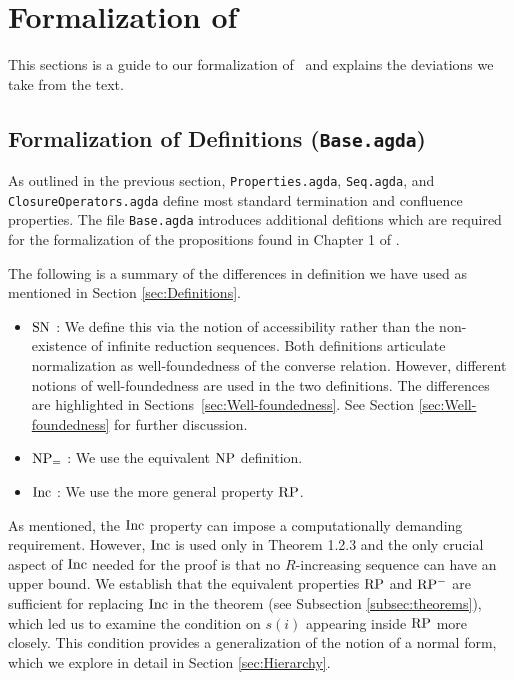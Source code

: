 \section{Formalization of \terese}
\label{sec:Formalization}
This sections is a guide to our formalization of \terese $\,$ and explains the deviations we take from the text. 

\subsection{Formalization of Definitions (\texttt{Base.agda})}\label{subsec:def}

As outlined in the previous section, \texttt{Properties.agda}, \texttt{Seq.agda}, and \texttt{ClosureOperators.agda} define most standard termination and confluence properties. The file \texttt{Base.agda} introduces additional defitions which are required for the formalization of the propositions found in Chapter 1 of \terese.




The following is a summary of the differences in definition we have used as mentioned in Section \ref{sec:Definitions}.
\begin{itemize}
    \item $\mathrm{SN}$ : We define this via the notion of accessibility rather than the non-existence of infinite reduction sequences. Both definitions articulate normalization as well-foundedness of the converse relation. However, different notions of well-foundedness are used in the two definitions. The differences are highlighted in Sections~\ref{sec:Well-foundedness}.
     See Section \ref{sec:Well-foundedness} for further discussion.
    \item $\mathrm{NP_=}$ : We use the equivalent $\mathrm{NP}$ definition.
    \item $\mathrm{Inc}$ : We use the more general property $\mathrm{RP}$.
\end{itemize}

As mentioned, the $\mathrm{Inc}$ property can impose a computationally demanding requirement. However, $\mathrm{Inc}$ is used only in Theorem 1.2.3
and the only crucial aspect of $\mathrm{Inc}$ needed for the proof is that no $R$-increasing
sequence can have an upper bound.
We establish that the equivalent properties $\mathrm{RP}$ and $\mathrm{RP^{-}}$ are sufficient for replacing $\mathrm{Inc}$ in the theorem (see Subsection \ref{subsec:theorems}),
which led us to examine the condition on $s (i)$ appearing inside $\mathrm{RP}$ more closely. This condition provides a generalization of the notion of a normal form,
which we explore in detail in Section \ref{sec:Hierarchy}.

